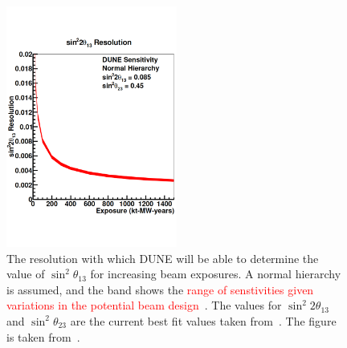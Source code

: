 \begin{figure}
  \centering
  \includegraphics[width=0.5\textwidth]{DUNETheta13Res}
  \caption[The resolution with which DUNE will be able to determine the value of $\sin^{2}\theta_{13}$ for increasing beam exposures]
          {The resolution with which DUNE will be able to determine the value of $\sin^{2}\theta_{13}$ for increasing beam exposures. A normal hierarchy is assumed, and the band shows the \textcolor{red}{range of senstivities given variations in the potential beam design}~\citep{DUNECDR_V3}. The values for $\sin^{2}2\theta_{13}$ and $\sin^{2}\theta_{23}$ are the current best fit values taken from~\citep{NuFit2014}. The figure is taken from~\citep{DUNECDR_V2}.}
  \label{fig:DUNETheta13Res}
\end{figure}

